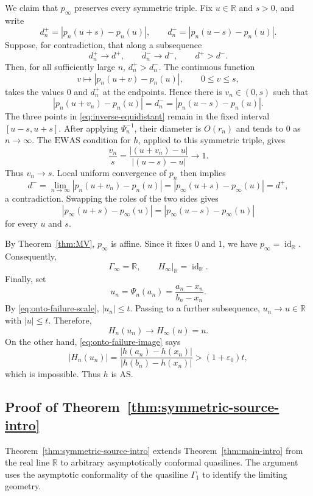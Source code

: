 \documentclass[10pt,a4paper]{amsart}
\numberwithin{equation}{section}
\newcommand{\R}{\mathbb{R}}
\newcommand{\id}{\operatorname{id}}
\begin{document}
We claim that $p_\infty$ preserves every symmetric  triple.  
Fix $u\in\R$ and $s>0$, and write
\[
 d_n^+=|p_n(u+s)-p_n(u)|,
 \qquad
 d_n^-=|p_n(u-s)-p_n(u)|.
\]
Suppose, for contradiction, that along a subsequence
\[
 d_n^+\to  d^+,\qquad d_n^-\to  d^-,\qquad d^+>d^-.
\]
Then, for all sufficiently large $n$, $d_n^+>d_n^-$.  
The continuous function
\[
 v\longmapsto |p_n(u+v)-p_n(u)|,\qquad 0\leq v\leq s,
\]
takes the values $0$ and $d_n^+$ at the endpoints.  
Hence there is $v_n\in(0,s)$ such that
\begin{equation}\label{eq:inverse-equidistant}
 |p_n(u+v_n)-p_n(u)|=d_n^-=|p_n(u-s)-p_n(u)|.
\end{equation}
The three points in \eqref{eq:inverse-equidistant} remain in the fixed interval $[u-s,u+s]$.  
After applying $\Psi_n^{-1}$, their diameter is $O(r_n)$ and tends to $0$ as $n \to \infty$.  
The $\mathrm{EWAS}$ condition for $h$, applied to this symmetric  triple, gives
\[
\frac{v_n}{s}= \frac{|(u+v_n)-u|}{|(u-s)-u|}\to 1.
\]
Thus $v_n\to s$.  
Local uniform convergence of $p_n$ then implies
\[
 d^-=\lim_{n \to \infty}|p_n(u+v_n)-p_n(u)|=|p_\infty(u+s)-p_\infty(u)|=d^+,
\]
a contradiction.  
Swapping the roles of the two sides gives
\begin{equation*}\label{eq:pinfty-isosceles}
 |p_\infty(u+s)-p_\infty(u)|
 =|p_\infty(u-s)-p_\infty(u)|
\end{equation*}
for every $u$ and $s$.

By Theorem~\ref{thm:MV}, $p_\infty$ is affine.  
Since it fixes $0$ and $1$, we have $p_\infty=\id_{\R}$.  
Consequently,
\[
 \Gamma_\infty=\R,\qquad H_\infty|_{\R}=\id_{\R}.
\]
Finally, set
\[
 u_n=\Psi_n(a_n)=\frac{a_n-x_n}{b_n-x_n}.
\]
By \eqref{eq:onto-failure-scale}, $|u_n|\leq t$.  
Passing to a further subsequence, $u_n\to u\in\R$ with $|u|\leq t$.  
Therefore,
\[
 H_n(u_n)\to  H_\infty(u)=u.
\]
On the other hand, \eqref{eq:onto-failure-image} says
\[
 |H_n(u_n)|=\frac{|h(a_n)-h(x_n)|}{|h(b_n)-h(x_n)|}>(1+\varepsilon_0)t,
\]
which is impossible.  
Thus $h$ is $\mathrm{AS}$.



\subsection{Proof of Theorem~\ref{thm:symmetric-source-intro}}

Theorem~\ref{thm:symmetric-source-intro} extends Theorem~\ref{thm:main-intro} from the real line $\mathbb{R}$ to arbitrary asymptotically conformal quasilines.  
The argument uses the asymptotic conformality of the quasiline $\Gamma_1$ to identify the limiting geometry.
\end{document}
